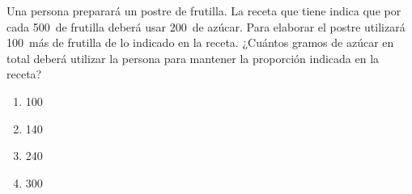 \begin{problem}
    Una persona preparará un postre de frutilla. La receta que tiene indica que por cada 500\, de frutilla deberá usar 200\, de azúcar. Para elaborar el postre utilizará 100\, más de frutilla de lo indicado en la receta. ¿Cuántos gramos de azúcar en total deberá utilizar la persona para mantener la proporción indicada en la receta?

    \begin{enumerate}[label=\Alph*.]
        \item 100\,
        \item 140\,
        \item 240\,
        \item 300\,
    \end{enumerate}
\end{problem}
